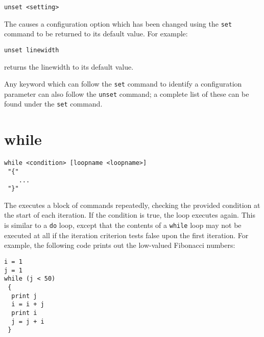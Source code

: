 \begin{verbatim}
unset <setting>
\end{verbatim}

The  causes a configuration option which has been changed using
the {\tt set} command to be returned to its default value.  For example:

\begin{verbatim}
unset linewidth
\end{verbatim}

\noindent returns the linewidth to its default value.

Any keyword which can follow the {\tt set} command to identify a configuration
parameter can also follow the {\tt unset} command; a complete list of these can
be found under the {\tt set} command.


\section{while}

\begin{verbatim}
while <condition> [loopname <loopname>]
 "{"
    ...
 "}"
\end{verbatim}

The  executes a block of commands repeatedly, checking the
provided condition at the start of each iteration. If the condition is true,
the loop executes again. This is similar to a {\tt do} loop, except that the
contents of a {\tt while} loop may not be executed at all if the iteration
criterion tests false upon the first iteration. For example, the following code
prints out the low-valued Fibonacci numbers:

\begin{verbatim}
i = 1
j = 1
while (j < 50)
 {
  print j
  i = i + j
  print i
  j = j + i
 }
\end{verbatim}

